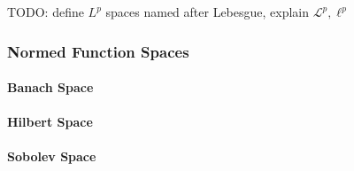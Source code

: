


TODO: define $L^p$ spaces named after Lebesgue, explain $\mathcal{L}^p, \ell^p$






\subsubsection{Normed Function Spaces}

\paragraph{Banach Space}

\paragraph{Hilbert Space}


\paragraph{Sobolev Space}



